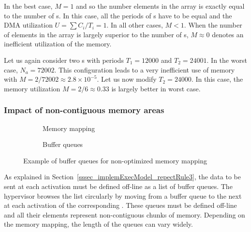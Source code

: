 \documentclass[main.tex]{subfiles}
\begin{document}
In the best case, $M=1$ and so the number elements in the array is exactly
equal to the number of \PC{}s. In this case, all the periods of \PC{}s have to
be equal and the DMA utilization $U = \sum C_i / T_i = 1$. In all other cases,
$M<1$. When the number of elements in the array is largely superior to the
number of \PC{}s, $M \approx 0$ denotes an inefficient utilization of the
memory.

\begin{example}
    Let us again consider two \PC{}s with periods $T_1 = 12000$ and $T_2 =
    24001$. In the worst case, $N_a = 72002$. This configuration leads to a
    very inefficient use of memory with $M = 2/72002 \approx 2.8 \times
    10^{-5}$. Let us now modify $T_2 = 24000$. In this case, the memory
    utilization $M = 2/6 \approx 0.33$ is largely better in worst case.
\end{example}

\subsubsection{Impact of non-contiguous memory areas}

\begin{figure}
    \centering
    \begin{subfigure}[b]{0.3\linewidth}
        \centering
        \scalebox{0.7}{}
        \caption{Memory mapping}
        \label{fig_implemExecModel_nonContigBuffers}
    \end{subfigure}\hspace{6mm}
    \begin{subfigure}[b]{0.65\linewidth}
        \centering
        \scalebox{0.7}{}
        \caption{Buffer queues}
        \label{fig_implemExecModel_nonContigBuffersQueues}
    \end{subfigure}
    \caption{Example of buffer queues for non-optimized memory mapping}
    \label{fig_implemExecModel_exNonContigBuffers}
\end{figure}

As explained in Section~\ref{sssec_implemExecModel_repectRule3}, the data to be
sent at each \PC{} activation must be defined off-line as a list of buffer
queues. The hypervisor browses the list circularly by moving from a buffer
queue to the next at each activation of the corresponding \PC{}. These queues
must be defined off-line and all their elements represent non-contiguous chunks
of memory. Depending on the memory mapping, the length of the queues can vary
widely.
\end{document}
